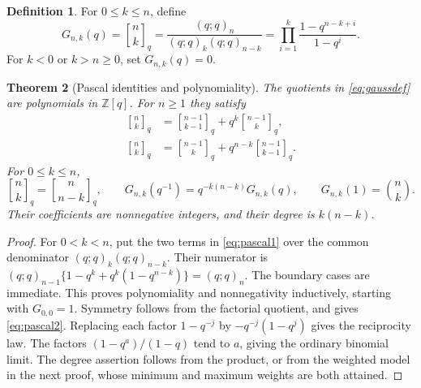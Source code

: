 \documentclass[11pt,a4paper]{article}
\numberwithin{equation}{section}
\newtheorem{theorem}{Theorem}[section]
\theoremstyle{definition}
\newtheorem{definition}[theorem]{Definition}
\theoremstyle{remark}
\newcommand{\Z}{\mathbb Z}
\newcommand{\G}[2]{\genfrac{[}{]}{0pt}{}{#1}{#2}_{q}}
\newcommand{\qp}[2]{(#1;q)_{#2}}
\begin{document}
\begin{definition}
For $0\le k\le n$, define
\begin{equation}
 G_{n,k}(q)=\G nk
 =\frac{\qp qn}{\qp qk\qp q{n-k}}
 =\prod_{i=1}^k\frac{1-q^{n-k+i}}{1-q^i}.
 \label{eq:gaussdef}
\end{equation}
For $k<0$ or $k>n\ge0$, set $G_{n,k}(q)=0$.
\end{definition}

\begin{theorem}[Pascal identities and polynomiality]
\label{thm:pascal}
The quotients in \cref{eq:gaussdef} are polynomials in $\Z[q]$. For $n\ge1$ they satisfy
\begin{align}
 \G nk&=\G{n-1}{k-1}+q^k\G{n-1}k,
 \label{eq:pascal1}\\
 \G nk&=\G{n-1}k+q^{n-k}\G{n-1}{k-1}.
 \label{eq:pascal2}
\end{align}
For $0\le k\le n$,
\begin{equation}
 \G nk=\G n{n-k},\qquad
 G_{n,k}(q^{-1})=q^{-k(n-k)}G_{n,k}(q),\qquad
 G_{n,k}(1)=\binom nk.
 \label{eq:symmetries}
\end{equation}
Their coefficients are nonnegative integers, and their degree is $k(n-k)$.
\end{theorem}
\begin{proof}
For $0<k<n$, put the two terms in \cref{eq:pascal1} over the
common denominator $\qp qk\qp q{n-k}$. Their numerator is
$\qp q{n-1}\{1-q^k+q^k(1-q^{n-k})\}=\qp qn$.
The boundary cases are immediate. This proves polynomiality and
nonnegativity inductively, starting with $G_{0,0}=1$. Symmetry follows from
the factorial quotient, and gives \cref{eq:pascal2}. Replacing each factor
$1-q^{-j}$ by $-q^{-j}(1-q^j)$ gives the reciprocity law.
The factors $(1-q^a)/(1-q)$ tend to $a$, giving the ordinary binomial
limit. The degree assertion follows from the product, or from the
weighted model in the next proof, whose minimum and maximum weights are
both attained.
\end{proof}
\end{document}
